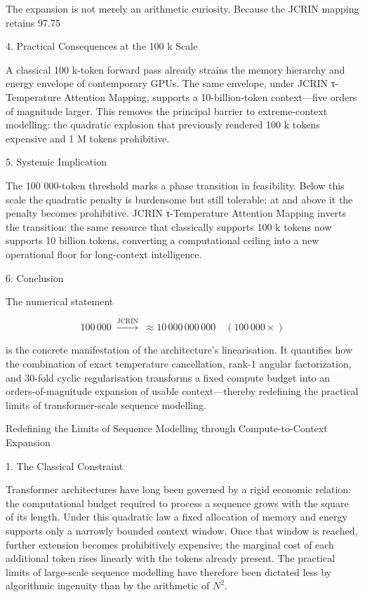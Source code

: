 The expansion is not merely an arithmetic curiosity. Because the JCRIN mapping retains 97.75 %

4. Practical Consequences at the 100 k Scale

A classical 100 k-token forward pass already strains the memory hierarchy and energy envelope of contemporary GPUs.  
The same envelope, under JCRIN τ-Temperature Attention Mapping, supports a 10-billion-token context—five orders of magnitude larger.  
This removes the principal barrier to extreme-context modelling: the quadratic explosion that previously rendered 100 k tokens expensive and 1 M tokens prohibitive.

5. Systemic Implication

The 100 000-token threshold marks a phase transition in feasibility. Below this scale the quadratic penalty is burdensome but still tolerable; at and above it the penalty becomes prohibitive. JCRIN τ-Temperature Attention Mapping inverts the transition: the same resource that classically supports 100 k tokens now supports 10 billion tokens, converting a computational ceiling into a new operational floor for long-context intelligence.

6. Conclusion

The numerical statement

\[
100\,000 \;\xrightarrow{\text{JCRIN}}\; \approx 10\,000\,000\,000 \quad (100\,000\times)
\]

is the concrete manifestation of the architecture’s linearisation. It quantifies how the combination of exact temperature cancellation, rank-1 angular factorization, and 30-fold cyclic regularisation transforms a fixed compute budget into an orders-of-magnitude expansion of usable context—thereby redefining the practical limits of transformer-scale sequence modelling.

Redefining the Limits of Sequence Modelling through Compute-to-Context Expansion

1. The Classical Constraint

Transformer architectures have long been governed by a rigid economic relation: the computational budget required to process a sequence grows with the square of its length. Under this quadratic law a fixed allocation of memory and energy supports only a narrowly bounded context window. Once that window is reached, further extension becomes prohibitively expensive; the marginal cost of each additional token rises linearly with the tokens already present. The practical limits of large-scale sequence modelling have therefore been dictated less by algorithmic ingenuity than by the arithmetic of \(N^2\).

